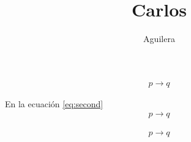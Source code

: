\documentclass[a4paper]{article}
\title{Carlos}
\author{Aguilera}
\begin{document}
	\begin{align}
			p \to q \label{eq:first}
	\end{align}

	En la ecuación \ref{eq:second}
	\begin{align}
		p \to q \label{eq:second}
	\end{align}

	\begin{align}
		p \to q \label{eq:third}
	\end{align}
\end{document}
